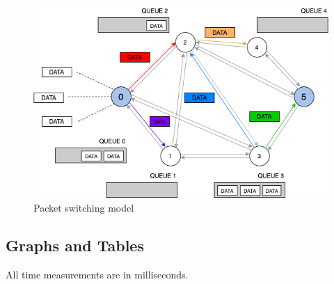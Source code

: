 \documentclass{article}
\begin{document}
  \begin{figure}[H]
    \centering
    \includegraphics[totalheight=8cm]{images/graph_ps.png}
    \renewcommand\figurename{Figure}
    \caption{Packet switching model}
    \label{fig:graph_ps}
  \end{figure}
  
  \subsection{Graphs and Tables}

  All time measurements are in milliseconds.
\end{document}
